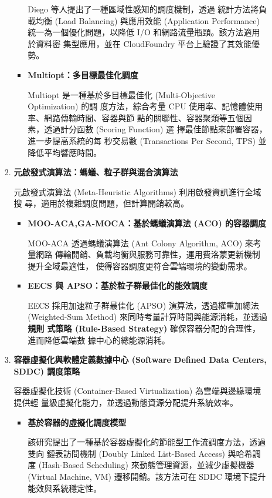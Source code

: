 \documentclass[12pt,a4paper]{article}
\begin{document}
\begin{enumerate}[label={(\zhdig*)}, leftmargin=2\parindent, listparindent=\parindent]
\begin{enumerate}[label={(\arabic*)}, leftmargin=\parindent, listparindent=\parindent]
\begin{enumerate}[label={(\zhdig*)}, leftmargin=\parindent, listparindent=\parindent]
\begin{itemize}[leftmargin=\parindent, listparindent=\parindent]
    Diego 等人提出了一種區域性感知的調度機制，透過
    統計方法將負載均衡 (Load Balancing) 與應用效能 (Application Performance)
    統一為一個優化問題，以降低 I/O 和網路流量瓶頸。該方法適用於資料密
    集型應用，並在 CloudFoundry 平台上驗證了其效能優勢。
    \item \textbf{\cite{13} Multiopt：多目標最佳化調度}

    Multiopt 是一種基於多目標最佳化 (Multi-Objective Optimization) 的調
    度方法，綜合考量 CPU 使用率、記憶體使用率、網路傳輸時間、容器與節
    點的關聯性、容器聚類等五個因素，透過計分函數 (Scoring Function) 選
    擇最佳節點來部署容器，進一步提高系統的每
    秒交易數 (Transactions Per Second, TPS) 並降低平均響應時間。

\end{itemize}
\item \textbf{
    元啟發式演算法：螞蟻、粒子群與混合演算法
}

元啟發式演算法 (Meta-Heuristic Algorithms) 利用啟發資訊進行全域搜
尋，適用於複雜調度問題，但計算開銷較高。
\begin{itemize}[leftmargin=\parindent, listparindent=\parindent]
    \item \textbf{\cite{14} MOO-ACA,GA-MOCA：基於螞蟻演算法 (ACO) 的容器調度}

    MOO-ACA 透過螞蟻演算法 (Ant Colony Algorithm, ACO) 來考量網路
    傳輸開銷、負載均衡與服務可靠性，運用費洛蒙更新機制提升全域最適性，
    使得容器調度更符合雲端環境的變動需求。

    \item \textbf{
        \cite{15} EECS 與 APSO：基於粒子群最佳化的能效調度
    }

    EECS 採用加速粒子群最佳化 (APSO) 演算法，透過權重加總法
    (Weighted-Sum Method) 來同時考量計算時間與能源消耗，並透過\textbf{規則
    式策略 (Rule-Based Strategy) }確保容器分配的合理性，進而降低雲端數
    據中心的總能源消耗。

\end{itemize}
\item \textbf{
    容器虛擬化與軟體定義數據中心 (Software Defined Data Centers, SDDC) 調度策略
}

容器虛擬化技術 (Container-Based Virtualization) 為雲端與邊緣環境提供輕
量級虛擬化能力，並透過動態資源分配提升系統效率。
\begin{itemize}[leftmargin=\parindent, listparindent=\parindent]
    \item \textbf{\cite{16} 基於容器的虛擬化調度模型}

    該研究提出了一種基於容器虛擬化的節能型工作流調度方法，透過雙向
    鏈表訪問機制 (Doubly Linked List-Based Access) 與哈希調度 (Hash-Based
    Scheduling) 來動態管理資源，並減少虛擬機器(Virtual Machine, VM)
    遷移開銷。該方法可在 SDDC 環境下提升能效與系統穩定性。


\end{itemize}
\end{enumerate}
\end{enumerate}
\end{enumerate}
\end{document}
